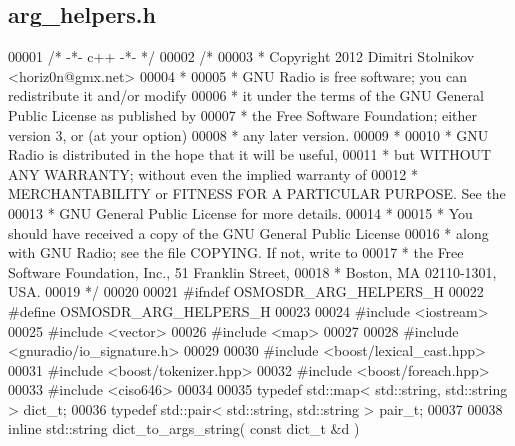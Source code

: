 \subsection{arg\+\_\+helpers.\+h}
\label{arg__helpers_8h_source}

\begin{DoxyCode}
00001 \textcolor{comment}{/* -*- c++ -*- */}
00002 \textcolor{comment}{/*}
00003 \textcolor{comment}{ * Copyright 2012 Dimitri Stolnikov <horiz0n@gmx.net>}
00004 \textcolor{comment}{ *}
00005 \textcolor{comment}{ * GNU Radio is free software; you can redistribute it and/or modify}
00006 \textcolor{comment}{ * it under the terms of the GNU General Public License as published by}
00007 \textcolor{comment}{ * the Free Software Foundation; either version 3, or (at your option)}
00008 \textcolor{comment}{ * any later version.}
00009 \textcolor{comment}{ *}
00010 \textcolor{comment}{ * GNU Radio is distributed in the hope that it will be useful,}
00011 \textcolor{comment}{ * but WITHOUT ANY WARRANTY; without even the implied warranty of}
00012 \textcolor{comment}{ * MERCHANTABILITY or FITNESS FOR A PARTICULAR PURPOSE.  See the}
00013 \textcolor{comment}{ * GNU General Public License for more details.}
00014 \textcolor{comment}{ *}
00015 \textcolor{comment}{ * You should have received a copy of the GNU General Public License}
00016 \textcolor{comment}{ * along with GNU Radio; see the file COPYING.  If not, write to}
00017 \textcolor{comment}{ * the Free Software Foundation, Inc., 51 Franklin Street,}
00018 \textcolor{comment}{ * Boston, MA 02110-1301, USA.}
00019 \textcolor{comment}{ */}
00020 
00021 \textcolor{preprocessor}{#ifndef OSMOSDR\_ARG\_HELPERS\_H}
00022 \textcolor{preprocessor}{#define OSMOSDR\_ARG\_HELPERS\_H}
00023 
00024 \textcolor{preprocessor}{#include <iostream>}
00025 \textcolor{preprocessor}{#include <vector>}
00026 \textcolor{preprocessor}{#include <map>}
00027 
00028 \textcolor{preprocessor}{#include <gnuradio/io\_signature.h>}
00029 
00030 \textcolor{preprocessor}{#include <boost/lexical\_cast.hpp>}
00031 \textcolor{preprocessor}{#include <boost/tokenizer.hpp>}
00032 \textcolor{preprocessor}{#include <boost/foreach.hpp>}
00033 \textcolor{preprocessor}{#include <ciso646>}
00034 
00035 \textcolor{keyword}{typedef} std::map< std::string, std::string > dict_t;
00036 \textcolor{keyword}{typedef} std::pair< std::string, std::string > pair_t;
00037 
00038 \textcolor{keyword}{inline} std::string dict_to_args_string( \textcolor{keyword}{const} dict_t &d )

\end{DoxyCode}
